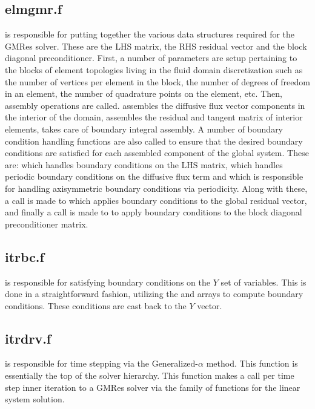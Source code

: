 \documentclass[./]{subfiles}
\begin{document}
\subsection{elmgmr.f}
 is responsible for putting together the various data structures required for the GMRes solver. These are the LHS matrix, the RHS residual vector and the block diagonal preconditioner. First, a number of parameters are setup pertaining to the blocks of element topologies living in the fluid domain discretization such as  the number of vertices per element in the block,  the number of degrees of freedom in an element,  the number of quadrature points on the element, etc. Then, assembly operations are called.  assembles the diffusive flux vector components in the interior of the domain,  assembles the residual and tangent matrix of interior elements,  takes care of boundary integral assembly. A number of boundary condition handling functions are also called to ensure that the desired boundary conditions are satisfied for each assembled component of the global system. These are:  which handles boundary conditions on the LHS matrix,  which handles periodic boundary conditions on the diffusive flux term and  which is responsible for handling axisymmetric boundary conditions via periodicity. Along with these, a call is made to  which applies boundary conditions to the global residual vector, and finally a call is made to  to apply boundary conditions to the block diagonal preconditioner matrix. 

\subsection{itrbc.f}
 is responsible for satisfying boundary conditions on the $Y$ set of variables. This is done in a straightforward fashion, utilizing the  and  arrays to compute boundary conditions. These conditions are cast back to the $Y$ vector.

\subsection{itrdrv.f}
 is responsible for time stepping via the Generalized-$\alpha$ method. This function is essentially the top of the solver hierarchy. This function makes a call per time step inner iteration to a GMRes solver via the  family of functions for the linear system solution. 
\end{document}
